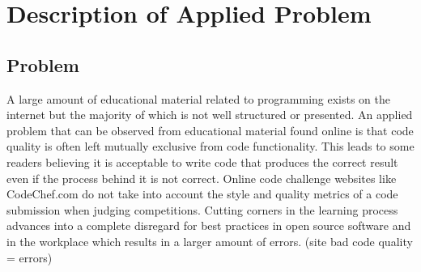 \documentclass{article}
\begin{document}


\begin{abstract} 
{\bf NOTE this is very important stuff!!} this is an example of an abstract.this is an example of an abstract.this
is an example of an abstract.this is an example of an abstract.this is
an example of an abstract.this is an example of an abstract.this is an
example of an abstract.this is an example of an abstract.this is an
example of an abstract.this is an example of an abstract.this is an
example of an abstract. \end{abstract} 


\section{Description of Applied
Problem}\label{description-of-applied-problem}

\subsection{Problem}\label{problem}

A large amount of educational material related to programming exists on
the internet but the majority of which is not well structured or
presented. An applied problem that can be observed from educational
material found online is that code quality is often left mutually
exclusive from code functionality. This leads to some readers believing
it is acceptable to write code that produces the correct result even if
the process behind it is not correct. Online code challenge websites
like CodeChef.com do not take into account the style and quality metrics
of a code submission when judging competitions. Cutting corners in the
learning process advances into a complete disregard for best practices
in open source software and in the workplace which results in a larger
amount of errors. (site bad code quality = errors)
\end{document}

